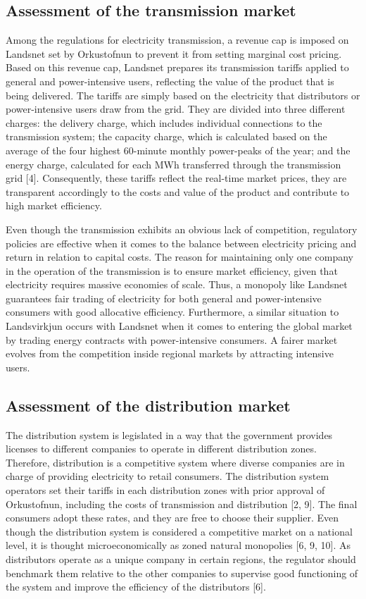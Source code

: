 \documentclass[svn, final]{rureport}
\begin{document}
\subsection{Assessment of the transmission market}

Among the regulations for electricity transmission, a revenue cap is imposed on Landsnet set by Orkustofnun to prevent it from setting marginal cost pricing. Based on this revenue cap, Landsnet prepares its transmission tariffs applied to general and power-intensive users, reflecting the value of the product that is being delivered. The tariffs are simply based on the electricity that distributors or power-intensive users draw from the grid. They are divided into three different charges: the delivery charge, which includes individual connections to the transmission system; the capacity charge, which is calculated based on the average of the four highest 60-minute monthly power-peaks of the year; and the energy charge, calculated for each MWh transferred through the transmission grid [4]. Consequently, these tariffs reflect the real-time market prices, they are transparent accordingly to the costs and value of the product and contribute to high market efficiency. 

Even though the transmission exhibits an obvious lack of competition, regulatory policies are effective when it comes to the balance between electricity pricing and return in relation to capital costs. The reason for maintaining only one company in the operation of the transmission is to ensure market efficiency, given that electricity requires massive economies of scale. Thus, a monopoly like Landsnet guarantees fair trading of electricity for both general and power-intensive consumers with good allocative efficiency. Furthermore, a similar situation to Landsvirkjun occurs with Landsnet when it comes to entering the global market by trading energy contracts with power-intensive consumers. A fairer market evolves from the competition inside regional markets by attracting intensive users. 

\subsection{Assessment of the distribution market}

The distribution system is legislated in a way that the government provides licenses to different companies to operate in different distribution zones. Therefore, distribution is a competitive system where diverse companies are in charge of providing electricity to retail consumers. The distribution system operators set their tariffs in each distribution zones with prior approval of Orkustofnun, including the costs of transmission and distribution [2, 9]. The final consumers adopt these rates, and they are free to choose their supplier. Even though the distribution system is considered a competitive market on a national level, it is thought microeconomically as zoned natural monopolies [6, 9, 10]. As distributors operate as a unique company in certain regions, the regulator should benchmark them relative to the other companies to supervise good functioning of the system and improve the efficiency of the distributors [6]. 
\end{document}
